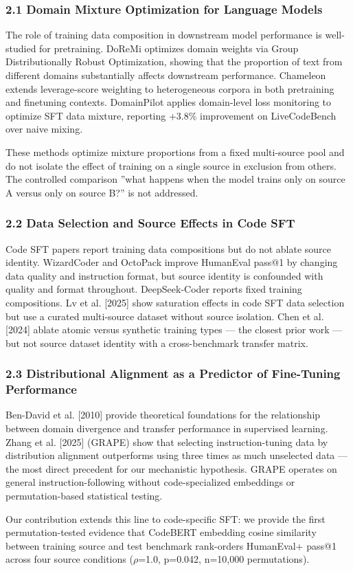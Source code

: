 
\subsubsection{2.1 Domain Mixture Optimization for Language Models}

The role of training data composition in downstream model performance is well-studied for pretraining. DoReMi \citep{Xie2023DoReMi} optimizes domain weights via Group Distributionally Robust Optimization, showing that the proportion of text from different domains substantially affects downstream performance. Chameleon \citep{Xie2025Chameleon} extends leverage-score weighting to heterogeneous corpora in both pretraining and finetuning contexts. DomainPilot \citep{Zhang2026DomainPilot} applies domain-level loss monitoring to optimize SFT data mixture, reporting +3.8\% improvement on LiveCodeBench over naive mixing.

These methods optimize mixture proportions from a fixed multi-source pool and do not isolate the effect of training on a single source in exclusion from others. The controlled comparison ''what happens when the model trains only on source A versus only on source B?'' is not addressed.

\subsubsection{2.2 Data Selection and Source Effects in Code SFT}

Code SFT papers report training data compositions but do not ablate source identity. WizardCoder \citep{Luo2023WizardCoder} and OctoPack \citep{Muennighoff2023OctoPack} improve HumanEval pass@1 by changing data quality and instruction format, but source identity is confounded with quality and format throughout. DeepSeek-Coder \citep{Guo2024DeepSeekCoder} reports fixed training compositions. Lv et al. [2025] show saturation effects in code SFT data selection but use a curated multi-source dataset without source isolation. Chen et al. [2024] ablate atomic versus synthetic training types --- the closest prior work --- but not source dataset identity with a cross-benchmark transfer matrix.

\subsubsection{2.3 Distributional Alignment as a Predictor of Fine-Tuning Performance}

Ben-David et al. [2010] provide theoretical foundations for the relationship between domain divergence and transfer performance in supervised learning. Zhang et al. [2025] (GRAPE) show that selecting instruction-tuning data by distribution alignment outperforms using three times as much unselected data --- the most direct precedent for our mechanistic hypothesis. GRAPE operates on general instruction-following without code-specialized embeddings or permutation-based statistical testing.

Our contribution extends this line to code-specific SFT: we provide the first permutation-tested evidence that CodeBERT embedding cosine similarity between training source and test benchmark rank-orders HumanEval+ pass@1 across four source conditions ($\rho$=1.0, p=0.042, n=10,000 permutations).

